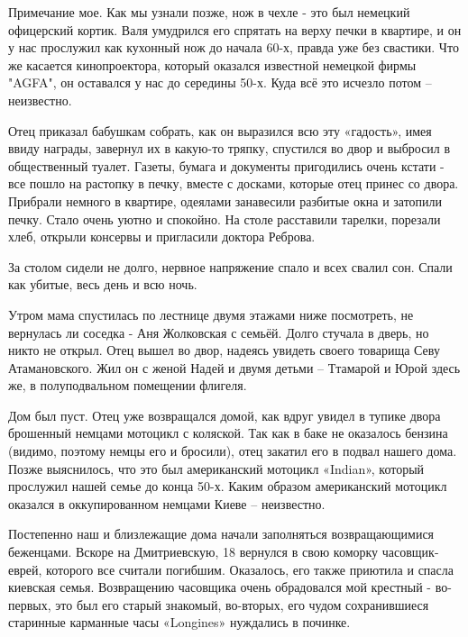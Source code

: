 Примечание мое. Как мы узнали позже, нож в чехле - это был немецкий офицерский
кортик. Валя умудрился его спрятать на верху печки в квартире, и он у нас
прослужил как кухонный нож до начала 60-х, правда уже без свастики. Что же
касается кинопроектора, который оказался известной немецкой фирмы "AGFA", он
оставался у нас до середины 50-х. Куда всё это исчезло потом – неизвестно. 


Отец приказал бабушкам собрать, как он выразился всю эту «гадость», имея ввиду
награды, завернул их в какую-то тряпку, спустился во двор и выбросил в
общественный туалет. Газеты, бумага и документы пригодились очень кстати - все
пошло на растопку в печку, вместе с досками, которые отец принес со двора.
Прибрали немного в квартире, одеялами занавесили разбитые окна и затопили
печку. Стало очень уютно и спокойно. На столе расставили тарелки, порезали
хлеб, открыли консервы и пригласили доктора Реброва.

За столом сидели не долго, нервное напряжение спало и всех свалил сон. Спали
как убитые, весь день и всю ночь. 

Утром мама спустилась по лестнице двумя этажами ниже посмотреть, не вернулась
ли соседка - Аня Жолковская с семьёй. Долго стучала в дверь, но никто не
открыл. Отец вышел во двор, надеясь увидеть своего товарища Севу Атамановского.
Жил он с женой Надей и двумя детьми – Ттамарой и Юрой здесь же, в
полуподвальном помещении флигеля. 


Дом был пуст. Отец уже возвращался домой, как вдруг увидел в тупике двора
брошенный немцами мотоцикл с коляской. Так как в баке не оказалось бензина
(видимо, поэтому немцы его и бросили), отец закатил его в подвал нашего дома.
Позже выяснилось, что это был американский мотоцикл «Indian», который прослужил
нашей семье до конца 50-х. Каким образом американский мотоцикл оказался в
оккупированном немцами Киеве – неизвестно. 

Постепенно наш и близлежащие дома начали заполняться возвращающимися беженцами.
Вскоре на Дмитриевскую, 18 вернулся в свою коморку часовщик-еврей, которого все
считали погибшим. Оказалось, его также приютила и спасла киевская семья.
Возвращению часовщика очень обрадовался мой крестный - во-первых, это был его
старый знакомый, во-вторых, его чудом сохранившиеся старинные карманные часы
«Longines» нуждались в починке.


